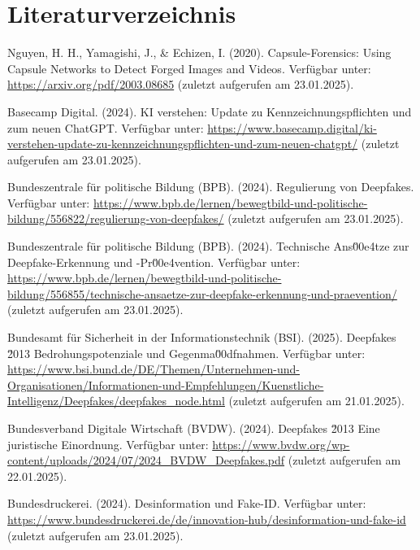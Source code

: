 \documentclass[a4paper,12pt]{article}
\begin{document}
\newpage
{}
\section*{Literaturverzeichnis}
\begin{thebibliography}{99}
     Nguyen, H. H., Yamagishi, J., \& Echizen, I. (2020). Capsule-Forensics: Using Capsule Networks to Detect Forged Images and Videos.
    Verfügbar unter: \url{https://arxiv.org/pdf/2003.08685} (zuletzt aufgerufen am 23.01.2025).
    
     Basecamp Digital. (2024). KI verstehen: Update zu Kennzeichnungspflichten und zum neuen ChatGPT. 
    Verfügbar unter: \url{https://www.basecamp.digital/ki-verstehen-update-zu-kennzeichnungspflichten-und-zum-neuen-chatgpt/} (zuletzt aufgerufen am 23.01.2025).
    
     Bundeszentrale für politische Bildung (BPB). (2024). Regulierung von Deepfakes. 
    Verfügbar unter: \url{https://www.bpb.de/lernen/bewegtbild-und-politische-bildung/556822/regulierung-von-deepfakes/} (zuletzt aufgerufen am 23.01.2025). 
    
     Bundeszentrale für politische Bildung (BPB). (2024). Technische Ans\u00e4tze zur Deepfake-Erkennung und -Pr\u00e4vention. 
    Verfügbar unter: \url{https://www.bpb.de/lernen/bewegtbild-und-politische-bildung/556855/technische-ansaetze-zur-deepfake-erkennung-und-praevention/} (zuletzt aufgerufen am 23.01.2025).
    
     Bundesamt für Sicherheit in der Informationstechnik (BSI). (2025). Deepfakes \u2013 Bedrohungspotenziale und Gegenma\u00dfnahmen. 
    Verfügbar unter: \url{https://www.bsi.bund.de/DE/Themen/Unternehmen-und-Organisationen/Informationen-und-Empfehlungen/Kuenstliche-Intelligenz/Deepfakes/deepfakes_node.html} (zuletzt aufgerufen am 21.01.2025).
    
     Bundesverband Digitale Wirtschaft (BVDW). (2024). Deepfakes \u2013 Eine juristische Einordnung. 
    Verfügbar unter: \url{https://www.bvdw.org/wp-content/uploads/2024/07/2024_BVDW_Deepfakes.pdf} (zuletzt aufgerufen am 22.01.2025). 
    
     Bundesdruckerei. (2024). Desinformation und Fake-ID. 
    Verfügbar unter: \url{https://www.bundesdruckerei.de/de/innovation-hub/desinformation-und-fake-id} (zuletzt aufgerufen am 23.01.2025). 
    

\end{thebibliography}
\end{document}
